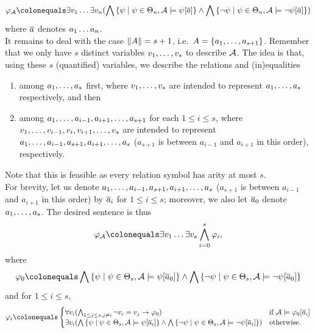 \begin{enumerate}[1.]
\begin{enumerate}[(a)]
\[
\varphi_\strct{A} \defas \exists v_1 \etc \exists v_n (\bland\setm{\psi}{\psi \in \Theta_n, \strct{A} \satis \psi[\vect{a}]} \land \bland\setm{\neg\psi}{\psi \in \Theta_n, \strct{A} \satis \neg\psi[\vect{a}]})
\]
where $\overline{a}$ denotes $a_1 \ldots a_n$.
\medskip\\
It remains to deal with the case $\|A\| = s + 1$, i.e.\ $A = {\{a_1, \ldots, a_{s + 1}\}}$. Remember that we only have $s$ distinct variables $v_1, \ldots, v_s$ to describe $\mathcal{A}$. The idea is that, using these $s$ (quantified) variables, we describe the relations and (in)equalities
\begin{enumerate}[(1)]
\item among $a_1, \ldots, a_s$ first, where $v_1, \ldots, v_s$ are intended to represent $a_1, \ldots, a_s$ respectively, and then
\item among $a_1, \ldots, a_{i - 1}, a_{i + 1}, \ldots, a_{s + 1}$ for each $1 \leq i \leq s$, where $v_1, \ldots, v_{i - 1}, v_i, v_{i + 1}, \ldots, v_s$ are intended to represent $a_1, \ldots, a_{i - 1}, a_{s + 1}, a_{i + 1}, \ldots, a_s$ ($a_{s + 1}$ is between $a_{i - 1}$ and $a_{i + 1}$ in this order), respectively.
\end{enumerate}
Note that this is feasible as every relation symbol has arity at most $s$.
\medskip\\
For brevity, let us denote $a_1, \ldots, a_{i - 1}, a_{s + 1}, a_{i + 1}, \ldots, a_s$ ($a_{s + 1}$ is between $a_{i - 1}$ and $a_{i + 1}$ in this order) by $\overline{a}_i$ for $1 \leq i \leq s$; moreover, we also let $\overline{a}_0$ denote $a_1, \ldots, a_s$. The desired sentence is thus
\[
\varphi_\strct{A} \defas \exists v_1 \etc \exists v_s \bland^s_{i = 0} \varphi_i,
\]
where
\[
\varphi_0 \defas \bland \setm{\psi}{\psi \in \Theta_s, \strct{A} \satis \psi[\vect{a}_0]} \land \bland \setm{\neg\psi}{\psi \in \Theta_s, \strct{A} \satis \neg\psi[\vect{a}_0]}
\]
and for $1 \leq i \leq s$,
\[
\varphi_i \defas
\begin{cases}
\forall v_i (\bland_{1 \leq j \leq s, j \neq i} \neg v_i = v_j \lthen \varphi_0) & \text{if \mathmode{\strct{A} \satis \varphi_0[\vect{a}_i]}}\cr
\exists v_i (\bland \setm{\psi}{\psi \in \Theta_s, \strct{A} \satis \psi[\vect{a}_i]} \land \bland \setm{\neg\psi}{\psi \in \Theta_s, \strct{A} \satis \neg\psi[\vect{a}_i]}) & \text{otherwise}.\cr
\end{cases}
\]
\end{enumerate}
%
\end{enumerate}
